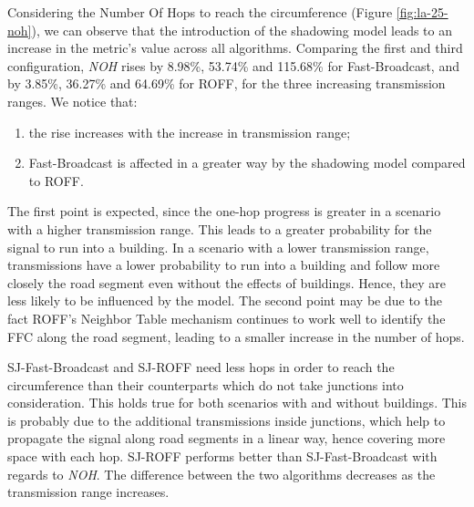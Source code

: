 		
		Considering the Number Of Hops to reach the circumference (Figure \ref{fig:la-25-noh}), we can observe that the introduction of the shadowing model leads to an increase in the metric's value across all algorithms. Comparing the first and third configuration, \textit{NOH} rises by 8.98\%, 53.74\% and 115.68\% for Fast-Broadcast, and by 3.85\%, 36.27\% and 64.69\% for ROFF, for the three increasing transmission ranges. We notice that:
		\begin{enumerate}
			\item the rise increases with the increase in transmission range;
			\item Fast-Broadcast is affected in a greater way by the shadowing model compared to ROFF.
		\end{enumerate}
		The first point is expected, since the one-hop progress is greater in a scenario with a higher transmission range. This leads to a greater probability for the signal to run into a building. In a scenario with a lower transmission range, transmissions have a lower probability to run into a building and follow more closely the road segment even without the effects of buildings. Hence, they are less likely to be influenced by the model. The second point may be due to the fact ROFF's Neighbor Table mechanism continues to work well to identify the FFC along the road segment, leading to a smaller increase in the number of hops.
		
		
		SJ-Fast-Broadcast and SJ-ROFF need less hops in order to reach the circumference than their counterparts which do not take junctions into consideration. This holds true for both scenarios with and without buildings. This is probably due to the additional transmissions inside junctions, which help to propagate the signal along road segments in a linear way, hence covering more space with each hop. SJ-ROFF performs better than SJ-Fast-Broadcast with regards to \textit{NOH}. The difference between the two algorithms decreases as the transmission range increases.
		
